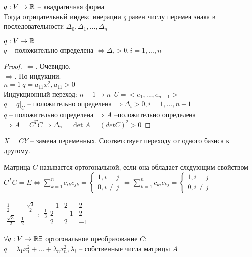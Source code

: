 \begin{Cons}
	$q: V \to \mathbb{R}$ -- квадратичная форма\\
	Тогда отрицательный индекс инерации $q$ равен числу перемен знака в последовательности $\Delta_0, \Delta_1, ..., \Delta_n$ 
\end{Cons}

\begin{Thm} 
	$q: V \to \mathbb{R}$\\
	$q$ -- положительно  определена $\Leftrightarrow \Delta_i > 0, i = 1,...,n$
\end{Thm} 

\begin{proof}
	$\Leftarrow.$ Очевидно.\\
	$\Rightarrow$. По индукции.\\
	$n=1 \ q = a_{11}x^2_1, a_{11} > 0$\\
	Индукционный переход: $n-1 \to n \ \ U = <e_1, ..., e_{n-1}>$\\
	$\overline{q} = q \big|_U$ -- положительно определена $\Rightarrow \Delta_i > 0, i = 1, ..., n-1$\\
	$q$ -- положительно определена $\Rightarrow A$ --положительно определена $\Rightarrow A = C^TC \Rightarrow \Delta_n = \det A = (det C)^2 > 0$ 
\end{proof}

\begin{Def} 
	$X = CY$ -- замена переменных. Соответствует переходу от одного базиса к другому. 
\end{Def} 

\begin{Def} 
	Матрица $C$ называется ортогональной, если она обладает следующим свойством $C^TC=E \Leftrightarrow \sum_{k=1}^{n} c_{ik} c_{jk} = \begin{cases}
		1, i = j\\
		0, i \neq j
	\end{cases} \Leftrightarrow \sum_{k=1}^{n} c_{ki}c_{kj} = \begin{cases}
		1, i = j\\
		0, i \neq j
	\end{cases}$
\end{Def} 

\begin{Example}
	$\begin{array}{cc}
		\frac{1}{2} & -\frac{\sqrt{3}}{2}\\
		\frac{\sqrt{3}}{2} & \frac{1}{2}
	\end{array}, \ \
	\frac{1}{3} 
	\begin{array}{ccc}
		-1 & 2 & 2\\
		2 & -1 & 2\\ 
		2 & 2 & -1
	\end{array}$
\end{Example}

\begin{Thm} 
	$\forall q: V \to \mathbb{R} \exists$ ортогональное преобразование $C:$\\
	$q = \lambda_1 x_1^2 + ... + \lambda_n x_n^2, \lambda_i$ -- собственные числа матрицы $A$
\end{Thm} 

